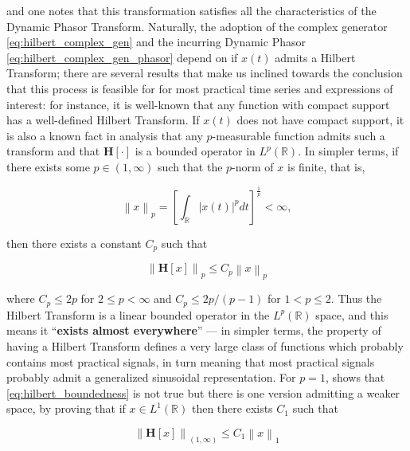 	\noindent and one notes that this transformation satisfies all the characteristics of the Dynamic Phasor Transform. Naturally, the adoption of the complex generator \eqref{eq:hilbert_complex_gen} and the incurring Dynamic Phasor \eqref{eq:hilbert_complex_gen_phasor} depend on if $x(t)$ admits a Hilbert Transform; there are several results that make us inclined towards the conclusion that this process is feasible for for most practical time series and expressions of interest: for instance, it is well-known that any function with compact support has a well-defined Hilbert Transform. If $x(t)$ does not have compact support, it is also a known fact in analysis \cite[p.~320]{grafakosClassicalFourierAnalysis2014} that any $p$-measurable function admits such a transform and that $\mathbf{H}\left[\cdot\right]$ is a bounded operator in $L^p\left(\mathbb{R}\right)$. In simpler terms, if there exists some $p\in\left(1,\infty\right)$ such that the $p$-norm of $x$ is finite, that is,

\begin{equation} \left\lVert x\right\rVert_p = \left[\int_{\mathbb{R}}\left\lvert x(t)\right\rvert^p dt\right]^{\frac{1}{p}} < \infty ,\end{equation}

	\noindent then there exists a constant $C_p$ such that

\begin{equation} \left\lVert \mathbf{H}\left[x\right]\right\rVert_p \leq C_p \left\lVert x\right\rVert_p \label{eq:hilbert_boundedness}\end{equation}

	\noindent where $C_p \leq 2p$ for $2\leq p< \infty$ and $C_p \leq 2p/(p-1)$ for $1 < p \leq 2$. Thus the Hilbert Transform is a linear bounded operator in the $L^p\left(\mathbb{R}\right)$ space, and this means it ``\textbf{exists almost everywhere}'' — in simpler terms, the property of having a Hilbert Transform defines a very large class of functions which probably contains most practical signals, in turn meaning that most practical signals probably admit a generalized sinusoidal representation. For $p=1$, \cite{grafakosClassicalFourierAnalysis2014} shows that \eqref{eq:hilbert_boundedness} is not true but there is one version admitting a weaker space, by proving that if $x\in L^1\left(\mathbb{R}\right)$ then there exists $C_1$ such that

\begin{equation} \left\lVert \mathbf{H}\left[x\right]\right\rVert_{\left(1,\infty\right)} \leq C_1 \left\lVert x\right\rVert_1 \label{eq:hilbert_boundedness_p1}\end{equation}

